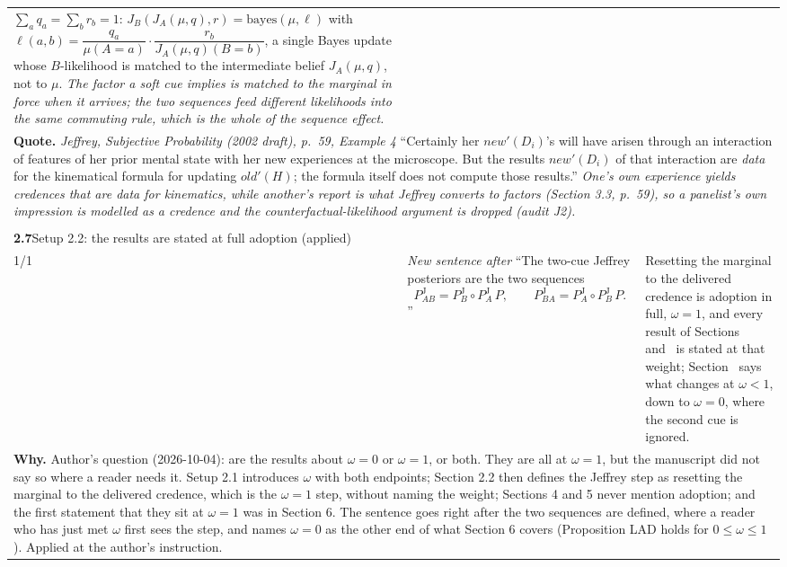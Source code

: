 \documentclass[10pt]{article}
\theoremstyle{definition}
\newcommand{\PJ}{P^{\mathrm{J}}}
\renewcommand{\ref}[1]{\textsc{\detokenize{#1}}}
\newlength{\fullw}\setlength{\fullw}{25.9cm}
\newcommand{\entryhead}[2]{\multicolumn{3}{|l|}{\rule{0pt}{2.6ex}\large\textbf{#1}\quad #2} \\ \hline}
\begin{document}
{\begin{longtable}{|p{0.9cm}|p{12.2cm}|p{12.2cm}|}
{$\sum_a q_a=\sum_b r_b=1$:
$J_B(J_A(\mu,q),r)=\mathrm{bayes}(\mu,\ell)$ with
$\ell(a,b)=\dfrac{q_a}{\mu(A{=}a)}\cdot\dfrac{r_b}{J_A(\mu,q)(B{=}b)}$, a single Bayes
update whose $B$-likelihood is matched to the intermediate belief $J_A(\mu,q)$, not to
$\mu$. \newline \textit{The factor a soft cue implies is matched to the marginal in force when it arrives;
the two sequences feed different likelihoods into the same commuting rule, which is the
whole of the sequence effect.}} \\
\multicolumn{3}{|p{\fullw}|}{\textbf{Quote.} \textit{Jeffrey, \emph{Subjective Probability} (2002 draft), p.~59, Example 4} \newline ``Certainly her $\mathit{new}'(D_i)$'s will have arisen through an interaction of
features of her prior mental state with her new experiences at the microscope. But the
results $\mathit{new}'(D_i)$ of that interaction are \emph{data} for the kinematical
formula for updating $\mathit{old}'(H)$; the formula itself does not compute those
results.'' \newline \textit{One's own experience yields credences that are data for kinematics, while another's
report is what Jeffrey converts to factors (Section 3.3, p.~59), so a panelist's own
impression is modelled as a credence and the counterfactual-likelihood argument is
dropped (audit J2).}} \\ \hline
\multicolumn{3}{|l|}{} \\ \hline
\entryhead{2.7}{Setup 2.2: the results are stated at full adoption (applied)\quad{\footnotesize\textit{(formerly C.25)}}}
1/1 & \textit{New sentence after} ``The two-cue Jeffrey posteriors are the two sequences \[ \PJ_{AB}=\PJ_{B}\!\circ\PJ_{A}\,P,\qquad \PJ_{BA}=\PJ_{A}\!\circ\PJ_{B}\,P . \]'' & Resetting the marginal to the delivered credence is adoption in full, $\omega=1$, and every result of Sections~\ref{sec:individual} and~\ref{sec:aggregation} is stated at that weight; Section~\ref{sec:scope} says what changes at $\omega<1$, down to $\omega=0$, where the second cue is ignored. \\ \hline
\multicolumn{3}{|p{\fullw}|}{\textbf{Why.} Author's question (2026-10-04): are the results about $\omega=0$ or $\omega=1$, or both. They are all at $\omega=1$, but the manuscript did not say so where a reader needs it. Setup 2.1 introduces $\omega$ with both endpoints; Section 2.2 then defines the Jeffrey step as resetting the marginal to the delivered credence, which is the $\omega=1$ step, without naming the weight; Sections 4 and 5 never mention adoption; and the first statement that they sit at $\omega=1$ was in Section 6. The sentence goes right after the two sequences are defined, where a reader who has just met $\omega$ first sees the step, and names $\omega=0$ as the other end of what Section 6 covers (Proposition LAD holds for $0\le\omega\le1$). Applied at the author's instruction.} \\

\end{longtable}}
\end{document}
